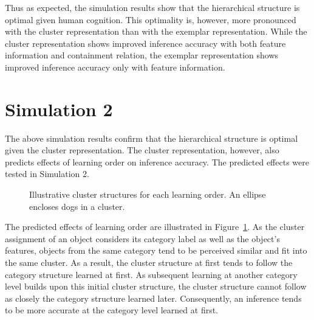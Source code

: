 \documentclass[doc]{apa6}
\begin{document}
Thus as expected, the simulation results show that the hierarchical structure is optimal given human
cognition. This optimality is, however, more pronounced with the cluster representation than with
the exemplar representation. While the cluster representation shows improved inference accuracy with
both feature information and containment relation, the exemplar representation shows improved
inference accuracy only with feature information.


\section*{Simulation 2}

The above simulation results confirm that the hierarchical structure is optimal given the cluster
representation. The cluster representation, however, also predicts effects of learning order on
inference accuracy. The predicted effects were tested in Simulation 2.

\begin{figure}
    \centering



    \vspace{10pt}

    \caption{Illustrative cluster structures for each learning order. An ellipse encloses dogs in a
    cluster.}

\label{fig:learning_order}
\end{figure}

The predicted effects of learning order are illustrated in Figure~\ref{fig:learning_order}. As the
cluster assignment of an object considers its category label as well as the object's features,
objects from the same category tend to be perceived similar and fit into the same cluster. As a
result, the cluster structure at first tends to follow the category structure learned at first.
As subsequent learning at another category level builds upon this initial cluster structure, the
cluster structure cannot follow as closely the category structure learned later. Consequently, an
inference tends to be more accurate at the category level learned at first.
\end{document}
